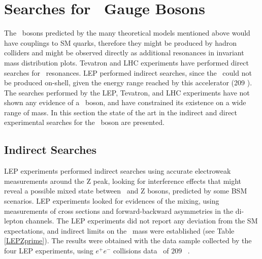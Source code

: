 % 

 
% 
% 


\section{Searches for \Zprime~Gauge Bosons}
\label{sec:Searches}


The \Zprime~bosons predicted by the many theoretical models mentioned above
 would have couplings to SM quarks, therefore they might be 
produced by hadron colliders and might be observed directly  as 
additional resonances in invariant mass distribution plots. Tevatron and LHC 
experiments have performed direct searches for \Zprime~resonances. LEP 
performed indirect searches, since the \Zprime~could not be produced on-shell, given the 
energy range reached by this accelerator (209 \GeV). The searches 
performed by the LEP, Tevatron, and LHC experiments have not shown any
evidence of a \Zprime~boson, and have constrained its existence on a wide
range of mass. In this section the state of the art in the indirect and direct
experimental searches for the \Zprime~boson are presented.


\subsection{Indirect Searches}
\label{subsec:IndirectSearches}

LEP experiments performed indirect searches using accurate electroweak 
measurements around the Z peak, looking for interference effects that might reveal a 
possible mixed state between \Zprime~and Z bosons, predicted by some BSM scenarios. LEP experiments 
looked for evidences of the mixing, using measurements of cross sections
and forward-backward asymmetries in the di-lepton channels. The LEP experiments did not report
any deviation from the SM expectations, and indirect limits on the \Zprime~mass were 
established (see Table \ref{LEPZprime}). The results were obtained with  the data sample 
collected by the four LEP experiments, using $e^{+}e^{-}$ collisions data \centermassenergy~of $209$ \GeV~\cite{LEP1,LEP2}.

